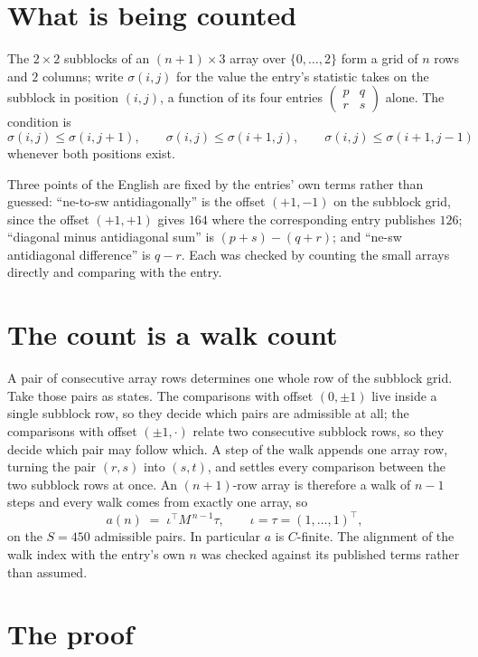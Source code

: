 \documentclass[11pt,a4paper]{article}
\theoremstyle{plain}
\theoremstyle{definition}
\begin{document}
\section{What is being counted}

The $2\times2$ subblocks of an $(n+1)\times3$ array over $\{0,\dots,2\}$ form a grid
of $n$ rows and $2$ columns; write $\sigma(i,j)$ for the value the entry's statistic takes on
the subblock in position $(i,j)$, a function of its four entries
$\begin{pmatrix}p&q\\r&s\end{pmatrix}$ alone. The condition is
\[
\sigma(i,j)\le\sigma(i,j+1),\qquad \sigma(i,j)\le\sigma(i+1,j),\qquad \sigma(i,j)\le\sigma(i+1,j-1)
\]
whenever both positions exist.

Three points of the English are fixed by the entries' own terms rather than guessed:
``ne-to-sw antidiagonally'' is the offset $(+1,-1)$ on the subblock grid, since the offset
$(+1,+1)$ gives $164$ where the corresponding entry publishes $126$; ``diagonal minus
antidiagonal sum'' is $(p+s)-(q+r)$; and ``ne-sw antidiagonal difference'' is $q-r$. Each was
checked by counting the small arrays directly and comparing with the entry.

\section{The count is a walk count}

A pair of consecutive array rows determines one whole row of the subblock grid. Take those
pairs as states. The comparisons with offset $(0,\pm1)$ live inside a single subblock row, so
they decide which pairs are admissible at all; the comparisons with offset $(\pm1,\cdot)$
relate two consecutive subblock rows, so they decide which pair may follow which. A step of the
walk appends one array row, turning the pair $(r,s)$ into $(s,t)$, and settles every comparison
between the two subblock rows at once. An $(n+1)$-row array is therefore a walk of $n-1$ steps
and every walk comes from exactly one array, so
\[
a(n)\;=\;\iota^{\!\top}M^{\,n-1}\tau,\qquad \iota=\tau=(1,\dots,1)^{\!\top},
\]
on the $S=450$ admissible pairs. In particular $a$ is $C$-finite. The alignment of the walk
index with the entry's own $n$ was checked against its published terms rather than assumed.

\section{The proof}
\end{document}
